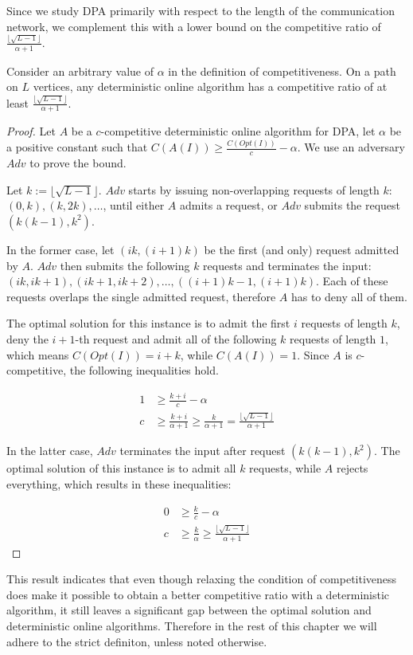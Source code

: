 Since we study DPA primarily with respect to the length of the
communication network, we complement this with a lower bound on the
competitive ratio of $\frac{\lfloor\sqrt{L-1}\rfloor}{\alpha+1}$.

\begin{theorem}\label{theorem:relaxed-dpa-deterministic}
    Consider an arbitrary value of $\alpha$ in the definition of
    competitiveness. On a path on $L$ vertices, any deterministic online
    algorithm has a competitive ratio of at least
    $\frac{\lfloor\sqrt{L-1}\rfloor}{\alpha+1}$.
\end{theorem}

\begin{proof}
    Let $A$ be a $c$-competitive deterministic online algorithm for DPA,
    let $\alpha$ be a positive constant such that $C(A(I)) \geq
    \frac{C(Opt(I))}{c} - \alpha$. We use an adversary $Adv$ to prove the
    bound.

    Let $k := \lfloor\sqrt{L-1}\rfloor$. $Adv$ starts by issuing
    non-overlapping requests of length $k$: $(0, k), (k, 2k), \dots$,
    until either $A$ admits a request, or $Adv$ submits the request
    $(k(k-1), k^2)$.

    In the former case, let $(ik, (i+1)k)$ be the first (and only) request
    admitted by $A$. $Adv$ then submits the following $k$ requests and
    terminates the input: $(ik, ik+1), (ik+1, ik+2), \dots, ((i+1)k-1,
    (i+1)k)$. Each of these requests overlaps the single admitted request,
    therefore $A$ has to deny all of them.

    The optimal solution for this instance is to admit the first $i$
    requests of length $k$, deny the $i+1$-th request and admit all of the
    following $k$ requests of length $1$, which means $C(Opt(I)) = i+k$,
    while $C(A(I)) = 1$. Since $A$ is $c$-competitive, the following
    inequalities hold.

    \begin{align*}
        1 &\geq \frac{k+i}{c} - \alpha \\
        c &\geq \frac{k+i}{\alpha + 1} \geq \frac{k}{\alpha + 1} =
        \frac{\lfloor\sqrt{L-1}\rfloor}{\alpha + 1}
    \end{align*}

    In the latter case, $Adv$ terminates the input after request $(k(k-1),
    k^2)$. The optimal solution of this instance is to admit all $k$
    requests, while $A$ rejects everything, which results in these
    inequalities:

    \begin{align*}
        0 &\geq \frac{k}{c} - \alpha \\
        c &\geq \frac{k}{\alpha} \geq \frac{\lfloor\sqrt{L-1}\rfloor}{\alpha + 1}
    \end{align*}
\end{proof}

This result indicates that even though relaxing the condition of
competitiveness does make it possible to obtain a better competitive ratio
with a deterministic algorithm, it still leaves a significant gap between
the optimal solution and deterministic online algorithms. Therefore in the
rest of this chapter we will adhere to the strict definiton, unless noted
otherwise.
